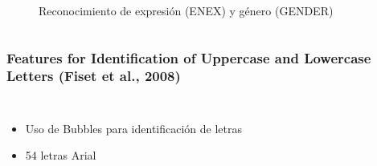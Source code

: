\documentclass[10pt]{beamer}
\begin{document}
\begin{frame}
\begin{columns}[t]
{\begin{figure}
		  \caption{Reconocimiento de expresión (ENEX) y género (GENDER)}
		\end{figure}
	    }
	  \end{columns}
	\end{frame}


      \begin{frame}
	\frametitle{Features for Identification of Uppercase and Lowercase Letters (Fiset et al., 2008)}

	\begin{columns}[t]
	    \begin{itemize}
		\item Uso de Bubbles para identificación de letras
		\item<2-> 54 letras Arial
	    \end{itemize}	    
\end{columns}
\end{frame}
\end{document}

